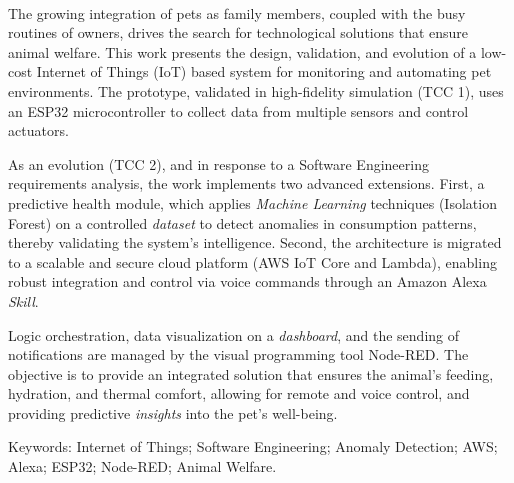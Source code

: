 \ \ \\[2cm]
The growing integration of pets as family members, coupled with the busy routines of owners, drives the search for technological solutions that ensure animal welfare. This work presents the design, validation, and evolution of a low-cost Internet of Things (IoT) based system for monitoring and automating pet environments. The prototype, validated in high-fidelity simulation (TCC 1), uses an ESP32 microcontroller to collect data from multiple sensors and control actuators.

As an evolution (TCC 2), and in response to a Software Engineering requirements analysis, the work implements two advanced extensions. First, a predictive health module, which applies \textit{Machine Learning} techniques (Isolation Forest) on a controlled \textit{dataset} to detect anomalies in consumption patterns, thereby validating the system's intelligence. Second, the architecture is migrated to a scalable and secure cloud platform (AWS IoT Core and Lambda), enabling robust integration and control via voice commands through an Amazon Alexa \textit{Skill}.

Logic orchestration, data visualization on a \textit{dashboard}, and the sending of notifications are managed by the visual programming tool Node-RED. The objective is to provide an integrated solution that ensures the animal's feeding, hydration, and thermal comfort, allowing for remote and voice control, and providing predictive \textit{insights} into the pet's well-being.

\vspace{1cm}
Keywords: Internet of Things; Software Engineering; Anomaly Detection; AWS; Alexa; ESP32; Node-RED; Animal Welfare.